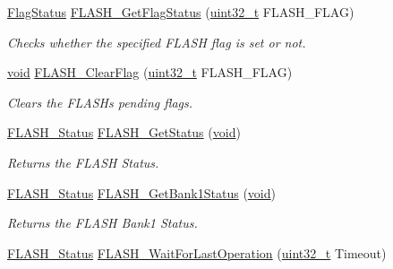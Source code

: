 \begin{DoxyCompactItemize}
\hyperlink{agilefox_2library_2inc_2stm32f10x__type_8h_a89136caac2e14c55151f527ac02daaff}{Flag\+Status} \hyperlink{group___f_l_a_s_h___private___functions_gae3fb545e32f21501ca27d4380e0f2088}{F\+L\+A\+S\+H\+\_\+\+Get\+Flag\+Status} (\hyperlink{_p_e___types_8h_a33594304e786b158f3fb30289278f5af}{uint32\+\_\+t} F\+L\+A\+S\+H\+\_\+\+F\+L\+AG)
\begin{DoxyCompactList}\small\item\em Checks whether the specified F\+L\+A\+SH flag is set or not. \end{DoxyCompactList}\item 
\hyperlink{usb__devapi_8h_afabf60e7f57651d6d595a02c75f07cd0}{void} \hyperlink{group___f_l_a_s_h___private___functions_gac4be1d486483fa5cd70ec77d44ca8f87}{F\+L\+A\+S\+H\+\_\+\+Clear\+Flag} (\hyperlink{_p_e___types_8h_a33594304e786b158f3fb30289278f5af}{uint32\+\_\+t} F\+L\+A\+S\+H\+\_\+\+F\+L\+AG)
\begin{DoxyCompactList}\small\item\em Clears the F\+L\+A\+SH\textquotesingle{}s pending flags. \end{DoxyCompactList}\item 
\hyperlink{group___f_l_a_s_h___exported___types_gadc63a6f3404ff1f71229a66915e9cdc0}{F\+L\+A\+S\+H\+\_\+\+Status} \hyperlink{group___f_l_a_s_h___private___functions_gac265b8d1e7ea11e44ceee28797c3debb}{F\+L\+A\+S\+H\+\_\+\+Get\+Status} (\hyperlink{usb__devapi_8h_afabf60e7f57651d6d595a02c75f07cd0}{void})
\begin{DoxyCompactList}\small\item\em Returns the F\+L\+A\+SH Status. \end{DoxyCompactList}\item 
\hyperlink{group___f_l_a_s_h___exported___types_gadc63a6f3404ff1f71229a66915e9cdc0}{F\+L\+A\+S\+H\+\_\+\+Status} \hyperlink{group___f_l_a_s_h___private___functions_ga9d5b76b75ef4c578cc45dc836a1929b6}{F\+L\+A\+S\+H\+\_\+\+Get\+Bank1\+Status} (\hyperlink{usb__devapi_8h_afabf60e7f57651d6d595a02c75f07cd0}{void})
\begin{DoxyCompactList}\small\item\em Returns the F\+L\+A\+SH Bank1 Status. \end{DoxyCompactList}\item 
\hyperlink{group___f_l_a_s_h___exported___types_gadc63a6f3404ff1f71229a66915e9cdc0}{F\+L\+A\+S\+H\+\_\+\+Status} \hyperlink{group___f_l_a_s_h___private___functions_ga2ad803999ae93ec03700983c59cae264}{F\+L\+A\+S\+H\+\_\+\+Wait\+For\+Last\+Operation} (\hyperlink{_p_e___types_8h_a33594304e786b158f3fb30289278f5af}{uint32\+\_\+t} Timeout)

\end{DoxyCompactItemize}
